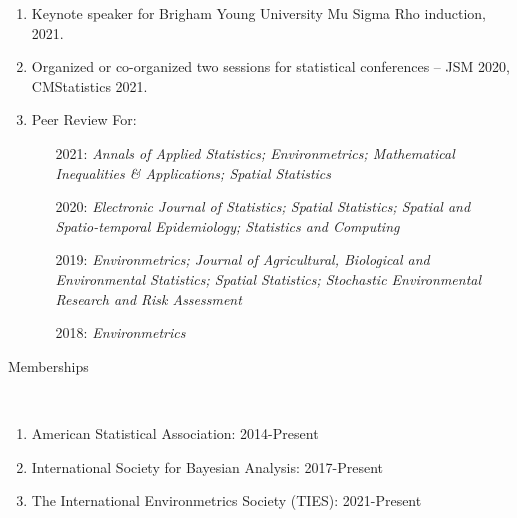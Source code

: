 \documentclass[11pt]{article}
\newcommand{\head}[1]{ %
    \bigskip %
    \begin{large}\begin{bf}{#1}\end{bf}\end{large} %

    \ \\ [-1.3cm] %

    \hrulefill}
\begin{document}
\begin{enumerate}[label=$\bullet$]
\begin{enumerate}[label=$\cdot$]
\item Keynote speaker for Brigham Young University Mu Sigma Rho induction, 2021.
\item Organized or co-organized two sessions for statistical conferences -- JSM 2020, CMStatistics 2021.
\item Peer Review For:
\begin{enumerate}
\item[2021:] \emph{Annals of Applied Statistics; Environmetrics; Mathematical Inequalities \& Applications; Spatial Statistics}
\item[2020:] \emph{Electronic Journal of Statistics; Spatial Statistics; Spatial and Spatio-temporal Epidemiology; Statistics and Computing}
\item[2019:] \emph{Environmetrics; Journal of Agricultural, Biological and Environmental Statistics; Spatial Statistics; Stochastic Environmental Research and Risk Assessment}
\item[2018:] \emph{Environmetrics}
\end{enumerate}

\end{enumerate}
\end{enumerate}

\head{Memberships}

\begin{enumerate}[label=$\bullet$]
\item American Statistical Association: 2014-Present
\item International Society for Bayesian Analysis: 2017-Present
\item The International Environmetrics Society (TIES): 2021-Present
\end{enumerate}
\end{document}
